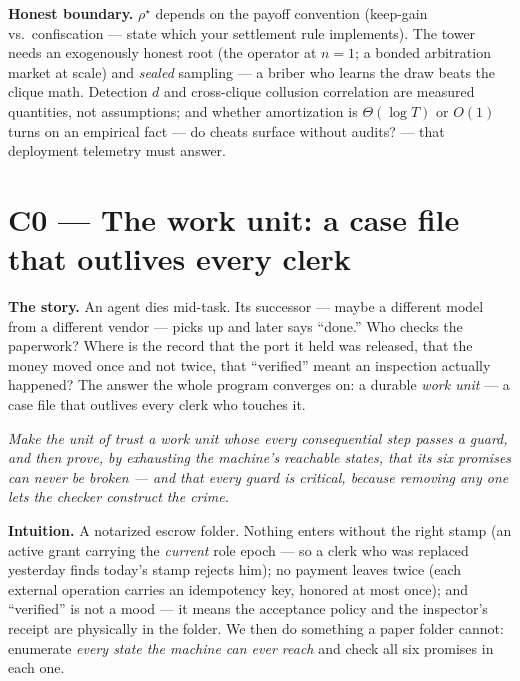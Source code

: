 \documentclass[11pt,a4paper]{article}
\newcommand{\onebreath}[1]{\begin{center}\emph{#1}\end{center}}
\begin{document}
\begin{boundary}
\textbf{Honest boundary.} $\rho^\star$ depends on the payoff convention (keep-gain vs.\ confiscation --- state which your settlement rule implements). The tower needs an exogenously honest root (the operator at $n{=}1$; a bonded arbitration market at scale) and \emph{sealed} sampling --- a briber who learns the draw beats the clique math. Detection $d$ and cross-clique collusion correlation are measured quantities, not assumptions; and whether amortization is $\Theta(\log T)$ or $O(1)$ turns on an empirical fact --- do cheats surface without audits? --- that deployment telemetry must answer.
\end{boundary}

\section{C0 --- The work unit: a case file that outlives every clerk}
\textbf{The story.} An agent dies mid-task. Its successor --- maybe a different model from a different vendor --- picks up and later says ``done.'' Who checks the paperwork? Where is the record that the port it held was released, that the money moved once and not twice, that ``verified'' meant an inspection actually happened? The answer the whole program converges on: a durable \emph{work unit} --- a case file that outlives every clerk who touches it.

\onebreath{Make the unit of trust a work unit whose every consequential step passes a guard, and then \emph{prove}, by exhausting the machine's reachable states, that its six promises can never be broken --- and that every guard is critical, because removing any one lets the checker construct the crime.}

\textbf{Intuition.} A notarized escrow folder. Nothing enters without the right stamp (an active grant carrying the \emph{current} role epoch --- so a clerk who was replaced yesterday finds today's stamp rejects him); no payment leaves twice (each external operation carries an idempotency key, honored at most once); and ``verified'' is not a mood --- it means the acceptance policy and the inspector's receipt are physically in the folder. We then do something a paper folder cannot: enumerate \emph{every state the machine can ever reach} and check all six promises in each one.
\end{document}
